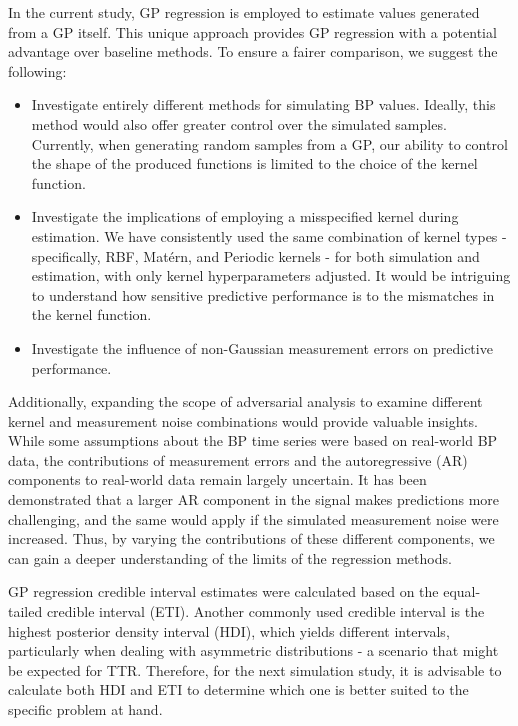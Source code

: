 In the current study, GP regression is employed to estimate values generated from a GP itself.
This unique approach provides GP regression with a potential advantage over baseline methods.
To ensure a fairer comparison, we suggest the following:

\begin{itemize}
    \item Investigate entirely different methods for simulating BP values.
    Ideally, this method would also offer greater control over the simulated samples.
    Currently, when generating random samples from a GP, our ability to control the shape of the produced
    functions is limited to the choice of the kernel function.

    \item Investigate the implications of employing a misspecified kernel during estimation.
    We have consistently used the same combination of kernel types - specifically, RBF, Matérn, and Periodic kernels -
    for both simulation and estimation, with only kernel hyperparameters adjusted.
    It would be intriguing to understand how sensitive predictive performance is to the mismatches in
    the kernel function.

    \item Investigate the influence
    of non-Gaussian measurement errors on predictive performance.
\end{itemize}

Additionally, expanding the scope of adversarial analysis to examine different
kernel and measurement noise combinations would provide valuable insights.
While some assumptions about the BP time series were based on real-world BP data,
the contributions of measurement errors and the autoregressive (AR) components
to real-world data remain largely uncertain.
It has been demonstrated that a larger AR component in the signal makes predictions
more challenging, and the same would apply if the simulated measurement noise were increased.
Thus, by varying the contributions of these different components,
we can gain a deeper understanding of the limits of the regression methods.

GP regression credible interval estimates were calculated based on the equal-tailed
credible interval (ETI). Another commonly used credible interval is
the highest posterior density interval (HDI), which yields different intervals,
particularly when dealing with asymmetric distributions - a scenario that might be expected for TTR.
Therefore, for the next simulation study, it is advisable to calculate both HDI and ETI
to determine which one is better suited to the specific problem at hand.

